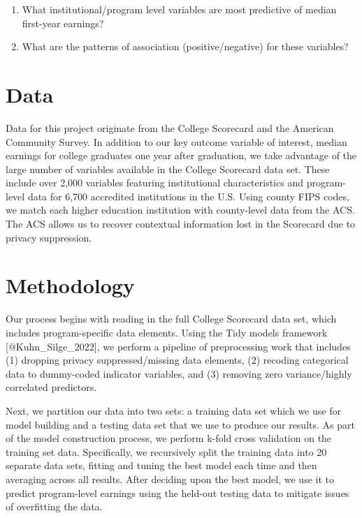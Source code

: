 \begin{enumerate}
\def\labelenumi{\arabic{enumi}.}
\tightlist
\item
  What institutional/program level variables are most predictive of
  median first-year earnings?
\item
  What are the patterns of association (positive/negative) for these
  variables?
\end{enumerate}

\hypertarget{data}{%
\section{Data}\label{data}}

Data for this project originate from the College Scorecard and the
American Community Survey. In addition to our key outcome variable of
interest, median earnings for college graduates one year after
graduation, we take advantage of the large number of variables available
in the College Scorecard data set. These include over 2,000 variables
featuring institutional characteristics and program-level data for 6,700
accredited institutions in the U.S. Using county FIPS codes, we match
each higher education institution with county-level data from the ACS.
The ACS allows us to recover contextual information lost in the
Scorecard due to privacy suppression.

\hypertarget{methodology}{%
\section{Methodology}\label{methodology}}

Our process begins with reading in the full College Scorecard data set,
which includes program-specific data elements. Using the Tidy models
framework {[}@Kuhn\_Silge\_2022{]}, we perform a pipeline of
preprocessing work that includes (1) dropping privacy suppressed/missing
data elements, (2) recoding categorical data to dummy-coded indicator
variables, and (3) removing zero variance/highly correlated predictors.

Next, we partition our data into two sets: a training data set which we
use for model building and a testing data set that we use to produce our
results. As part of the model construction process, we perform k-fold
cross validation on the training set data. Specifically, we recursively
split the training data into 20 separate data sets, fitting and tuning
the best model each time and then averaging across all results. After
deciding upon the best model, we use it to predict program-level
earnings using the held-out testing data to mitigate issues of
overfitting the data.

